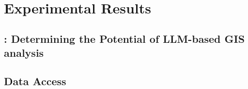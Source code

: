 \section{Experimental Results}
\label{sec:experimentalResults}

\subsection[RQ1: Determining the Potential of LLM-based GIS analysis]{: Determining the Potential of LLM-based GIS analysis}

\subsection{Data Access}




\begin{comment}
Results should be clearly displayed and should provide a suitable representation of your results for the points you wish to make.
Graphs should be labelled in a legible font. If more than one result is displayed in the same graph, then these should be clearly marked.
Please choose carefully rather than presenting every result. Too much information is hard to read and often hides the key information you wish to present. Make use of statistical methods when presenting results, where possible to strengthen the results.
Further, the format of the presentation of results should be chosen based on what issues in the results you wish to highlight.
You may wish to present a subset in the experimental section and provide additional results in an appendix.
Point out specifics here but save the overall/general discussion to the Discussion chapter.
\end{comment}

\glsresetall
